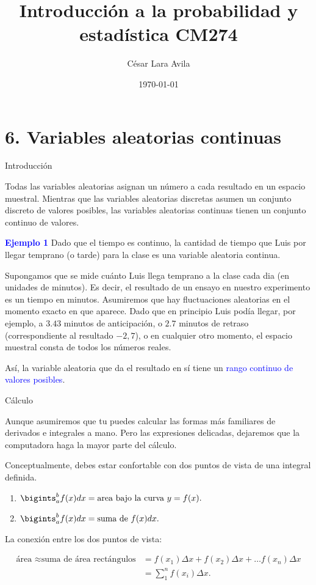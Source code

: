 \documentclass[10pt]{beamer}
\title{Introducci\'on a la probabilidad y estad\'istica CM274}
\date{\today}
\author{C\'esar Lara Avila}
\institute{\url{https://github.com/C-Lara}}
\begin{document}
  \maketitle
  \section{6. Variables aleatorias continuas }
  
\begin{frame}{Introducci\'on}

\small {Todas las variables aleatorias asignan un n\'umero a cada resultado en un espacio muestral. Mientras que las variables aleatorias discretas asumen un conjunto discreto de valores posibles, las variables aleatorias continuas tienen un conjunto continuo de valores.}
	

\vspace{0.6cm}


\scriptsize{\textcolor{blue}{\textbf {Ejemplo 1}}  Dado que el tiempo es continuo, la cantidad de tiempo que Luis por llegar  temprano (o tarde) para la clase es una variable aleatoria continua. 

Supongamos que 	se mide cu\'anto Luis llega temprano a la clase cada dia (en unidades de minutos). Es decir, el resultado de un ensayo en nuestro experimento es un tiempo en minutos. Asumiremos que hay fluctuaciones aleatorias en el momento exacto en que aparece. Dado que en principio Luis pod\'ia llegar, por ejemplo, a $3.43$ minutos de anticipaci\'on, o $2.7$ minutos de retraso (correspondiente al resultado $-2,7$), o en cualquier otro momento, el espacio muestral consta de todos los n\'umeros reales.

As\'i, la variable aleatoria que da el resultado en s\'i tiene un \textcolor{blue}{rango continuo de valores posibles}. 
	
}
\end{frame}

\begin{frame}{C\'alculo}
\small {Aunque asumiremos que tu puedes calcular las formas m\'as familiares de derivados e integrales a mano. Pero las expresiones delicadas, dejaremos que la computadora haga la mayor parte del c\'alculo. 
	
Conceptualmente, debes estar confortable  con dos puntos de vista de una integral definida.

\begin{enumerate}
	\item $\bigints_{a}^{b}f(x) dx = \text{area bajo la curva}\ y = f(x).$
	\item $\bigints_{a}^{b}f(x) dx = \text{suma de}\ f(x) dx.$
\end{enumerate}

\vspace{0.2cm}

La conexi\'on entre los dos puntos de vista:

\begin{align*}
\text{\'area } \approx \text{suma de \'area rect\'angulos} &= f(x_1)\Delta x + f(x_2)\Delta x + \dots f(x_n)\Delta x \\ & = \sum_{1}^{n}f(x_i)\Delta x.
\end{align*}
}
\end{frame}
\end{document}
